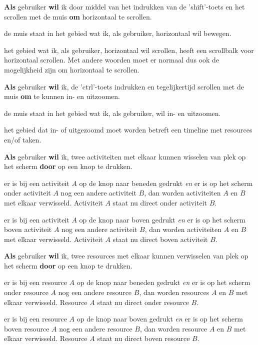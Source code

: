 \nextUserStory
\textbf{Als} gebruiker \textbf{wil} ik door middel van het indrukken van de 'shift'-toets en het scrollen met de muis \textbf{om} horizontaal te scrollen. 
\beginGegeven
    \item de muis staat in het gebied wat ik, als gebruiker, horizontaal wil bewegen.
    \item het gebied wat ik, als gebruiker, horizontaal wil scrollen, heeft een scrollbalk voor horizontaal scrollen. Met andere woorden moet er normaal dus ook de mogelijkheid zijn om horizontaal te scrollen.
\endGegeven

\nextUserStory
\textbf{Als} gebruiker \textbf{wil} ik, de 'ctrl'-toets indrukken en tegelijkertijd scrollen met de muis \textbf{om} te kunnen in- en uitzoomen. 
\beginGegeven
    \item de muis staat in het gebied wat ik, als gebruiker, wil in- en uitzoomen. 
    \item het gebied dat in- of uitgezoomd moet worden betreft een timeline met resources en/of taken.
\endGegeven

\nextUserStory
\textbf{Als} gebruiker \textbf{wil} ik, twee activiteiten met elkaar kunnen wisselen van plek op het scherm \textbf{door} op een knop te drukken. 
\beginGegeven
    \item er is bij een activiteit $A$ op de knop naar beneden gedrukt \emph{en} er is op het scherm onder activiteit $A$ nog een andere activiteit $B$, dan worden activiteiten $A$ en $B$ met elkaar verwisseld. Activiteit $A$ staat nu direct onder activiteit $B$.
    \item er is bij een activiteit $A$ op de knop naar boven gedrukt \emph{en} er is op het scherm boven activiteit $A$ nog een andere activiteit $B$, dan worden activiteiten $A$ en $B$ met elkaar verwisseld. Activiteit $A$ staat nu direct boven activiteit $B$.
\endGegeven

\nextUserStory
\textbf{Als} gebruiker \textbf{wil} ik, twee resources met elkaar kunnen verwisselen van plek op het scherm \textbf{door} op een knop te drukken.
\beginGegeven
    \item er is bij een resource $A$ op de knop naar beneden gedrukt \emph{en} er is op het scherm onder resource $A$ nog een andere resource $B$, dan worden resources $A$ en $B$ met elkaar verwisseld. Resource $A$ staat nu direct onder resource $B$.
    \item er is bij een resource $A$ op de knop naar boven gedrukt \emph{en} er is op het scherm boven resource $A$ nog een andere resource $B$, dan worden resource $A$ en $B$ met elkaar verwisseld. Resource $A$ staat nu direct boven resource $B$.
\endGegeven

